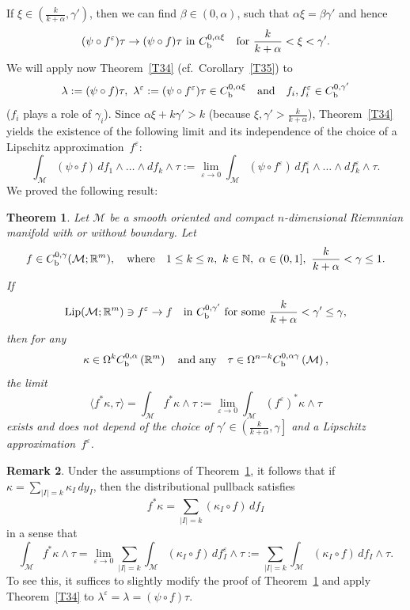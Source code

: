 \documentclass[intlimits,12pt,reqno]{amsart}
\newcommand{\cM}{\mathcal M}
\newcommand{\bbbn}{\mathbb N}
\newcommand{\R}{\mathbb R}
\newcommand{\eps}{\varepsilon}
\numberwithin{equation}{section}
\def\lip{\operatorname{Lip}}
\newtheorem{theorem}{Theorem}[section]
\theoremstyle{definition}
\newtheorem{remark}[theorem]{Remark}
\begin{document}
If $\xi\in (\frac{k}{k+\alpha},\gamma')$, then we can find $\beta\in (0,\alpha)$, such that $\alpha\xi=\beta\gamma'$ and hence
$$
(\psi\circ f^\eps)\tau\to(\psi\circ f)\tau
\text{ in } C_{\rm b}^{0,\alpha\xi}
\quad
\text{for }
\frac{k}{k+\alpha}<\xi<\gamma'.
$$
We will apply now Theorem~\ref{T34} (cf.\ Corollary~\ref{T35}) to
$$
\lambda:=(\psi\circ f)\tau,\
{\lambda^\eps}:=(\psi\circ f^\eps)\tau\in C_{\rm b}^{0,\alpha\xi}
\quad
\text{and}
\quad
f_i,f_i^\eps\in C_{\rm b}^{0,\gamma'}
$$
($f_i$ plays a role of $\gamma_i$). 
Since $\alpha\xi+k\gamma'>k$
(because $\xi,\gamma'>\frac{k}{k+\alpha}$), Theorem~\ref{T34} yields the existence of the following limit
and its independence of the choice of a Lipschitz approximation~$f^\eps$:
$$
\int_{\cM}(\psi\circ f)\, df_1\wedge\ldots\wedge df_k\wedge\tau:=
\lim_{\eps\to 0}\int_{\cM}(\psi\circ f^\eps)\, df_1^\eps\wedge\ldots\wedge df_k^\eps\wedge\tau.
$$
We proved the following result:
\begin{theorem}
\label{T79}
Let $\cM$ be a smooth oriented and compact $n$-dimensional Riemnnian manifold with or without boundary. Let 
$$
f\in C_{\rm b}^{0,\gamma}(\cM;\R^m),
\quad
\text{where}
\quad
1\leq k\leq n,\ k\in\bbbn,\ \alpha\in (0,1],\ \frac{k}{k+\alpha}<\gamma\leq 1.
$$
If
$$
\lip({\cM};\R^m)\ni f^\eps\to f
\quad
\text{in $C_{\rm b}^{0,\gamma'}$ for some $\frac{k}{k+\alpha}<\gamma'\leq\gamma$,}
$$
then for any
$$
\kappa\in \Omega^k C_{\rm b}^{0,\alpha}\left(\R^m\right)
\quad
\text{and any}
\quad
\tau\in \Omega^{n-k}C_{\rm b}^{0,\alpha\gamma}\left(\cM\right),
$$
the limit
$$
\langle f^*\kappa,\tau\rangle=
\int_{\cM} f^*\kappa\wedge\tau
:=
\lim_{\eps\to 0}
\int_{\cM} (f^\eps)^*\kappa\wedge\tau
$$
exists and does not depend of the choice of $\gamma'\in\left(\frac{k}{k+\alpha},\gamma\right]$ and a Lipschitz approximation~$f^\eps$.
\end{theorem}
\begin{remark}
\label{R4}
Under the assumptions of Theorem~\ref{T79}, it follows that if $\kappa=\sum_{|I|=k}\kappa_I\, dy_I$, then the distributional pullback satisfies
$$
f^*\kappa = \sum_{|I|=k} (\kappa_I\circ f)\, df_I
$$
in a sense that
$$
\int_{\cM} f^*\kappa\wedge\tau=
\lim_{\eps\to 0}
\sum_{|I|=k} \int_{\cM} (\kappa_I\circ f)\, df^\eps_I\wedge\tau:=
\sum_{|I|=k} \int_{\cM} (\kappa_I\circ f)\, df_I\wedge\tau.
$$
To see this, it suffices to slightly modify the proof of Theorem~\ref{T79} and apply Theorem~\ref{T34} to
$\lambda^\eps=\lambda=(\psi\circ f)\tau$.
\end{remark}
\end{document}

